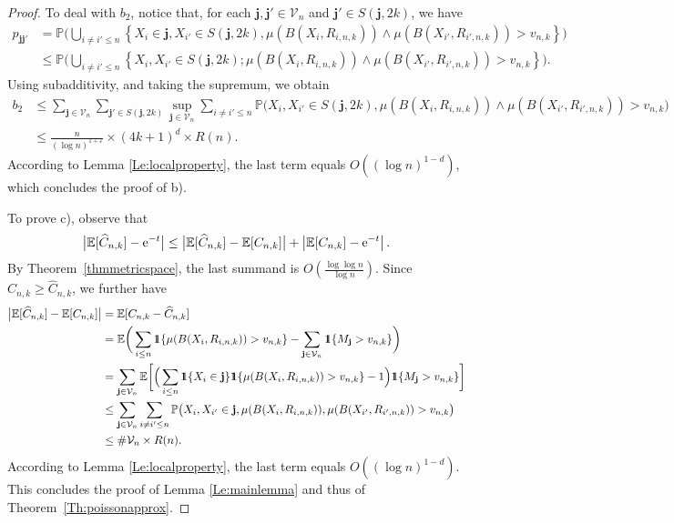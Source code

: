 \documentclass{article}
\theoremstyle{thm}
\theoremstyle{definition}
\theoremstyle{definition}
\theoremstyle{def}
\newcommand{\E}{\mathbb{E}} %
\newcommand{\PP}{\mathbb{P}} %
\newcommand{\jj}{\mathbf{j}}
\newcommand{\VV}{\mathcal{V}_n}
\newcommand{\ind}{1\hspace{-0,9ex}1}
\begin{document}
\begin{proof}
\medskip



To {deal with $b_2$}, notice that, for each $\jj,\jj'\in \VV$ and $\jj'\in S(\jj,2k)$, we have
\begin{align*}
p_{\jj\jj'} & = \PP \Big( \bigcup_{i\neq i'\leq n}  \left\{  X_i\in \jj, X_{i'}\in S(\jj,2k),  \mu(B(X_i,R_{i,n,k}))\wedge \mu(B(X_{i'},R_{i',n,k})) >v_{n,k}  \right\}   \Big)\\
& \leq \PP \Big( \bigcup_{i\neq i'\leq n}  \left\{  X_i, X_{i'}\in S(\jj,2k); \mu(B(X_i,R_{i,n,k})) \wedge  \mu(B(X_{i'},R_{i',n,k})) >v_{n,k}  \right\}    \Big).
\end{align*}
Using subadditivity, and taking the supremum, we obtain
\begin{align*}
b_2 & \leq \sum_{\jj\in \VV}\sum_{\jj'\in S(\jj,2k)} \sup_{\jj\in\VV}\sum_{i\neq i'\leq n}\PP \big(X_i,X_{i'}\in S(\jj,2k), \mu(B(X_i,R_{i,n,k})) \wedge\mu(B(X_{i'},R_{i',n,k}))>v_{n,k}\big) \\
& \leq \frac{n}{(\log n)^{1+\varepsilon}}\times (4k+1)^d\times R(n).
\end{align*}
According to  Lemma \ref{Le:localproperty}, the last term equals  $O\left(\left(\log n\right)^{1-d}   \right)$, {which concludes the proof of b).}

\bigskip



To prove c), observe that
\[
\big{|} \E [\widehat{C}_{n,k}] - {\rm e}^{-t} \big{|} \le \big{|}\E[\widehat{C}_{n,k}] -  \E[C_{n,k}]\big{|} + \left|\E[C_{n,k}] - {\rm e}^{-t}\right|.
\]
By Theorem~\ref{thmmetricspace}, the last summand is $O\left( \frac{\log\log n}{\log n}  \right)$. Since $C_{n,k} \ge \widehat{C}_{n,k}$, we further have
\begin{align*}
\big{|}\E [\widehat{C}_{n,k}] - \E[C_{n,k}]\big{|} & = \E [C_{n,k}-\widehat{C}_{n,k}]\\
& = \E \bigg( \sum_{i\leq n} \ind \{\mu(B(X_i, R_{i,n,k}))>v_{n,k}\} - \sum_{\jj\in\VV} \ind \{M_\jj>v_{n,k}\}  \bigg)\\
& = \sum_{\jj\in\VV} \E \bigg[ \Big( \sum_{i\leq n} \ind\{X_i\in \jj\} \ind \{\mu(B(X_i,R_{i,n,k})) > v_{n,k} \}  - 1 \Big)\ind \{M_\jj>v_{n,k}\} \bigg]\\
& \leq \sum_{\jj\in \VV}\sum_{i\neq i'\leq n} \mathbb{P} \big(X_i,X_{i'}\in \jj, \mu(B(X_i,R_{i,n,k})), \mu(B(X_{i'},R_{i',n,k}))> v_{n,k} \big)\\
& \leq \#\VV \times R(n).
\end{align*}
According to  Lemma \ref{Le:localproperty}, the last term equals  $O\left(\left(\log n\right)^{1-d}   \right)$. This concludes the proof of Lemma \ref{Le:mainlemma} and thus of Theorem~\ref{Th:poissonapprox}.

\end{proof}
\end{document}
